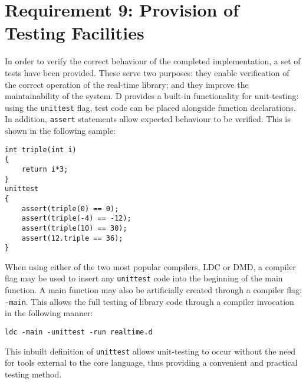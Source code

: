 \section{Requirement 9: Provision of Testing Facilities}
In order to verify the correct behaviour of the completed implementation, a set 
of tests have been provided. These serve two purposes: they enable verification
of the correct operation of the real-time library; and they improve the
maintainability of the system. 
D provides a built-in 
functionality for unit-testing: using the \texttt{unittest} flag, test code can 
be placed alongside function declarations. In addition, \texttt{assert} statements 
allow expected behaviour to be verified. 
This is shown in the following sample:
\begin{lstlisting}[basicstyle=\small]
int triple(int i) 
{
    return i*3; 
}
unittest 
{
    assert(triple(0) == 0); 
    assert(triple(-4) == -12); 
    assert(triple(10) == 30); 
    assert(12.triple == 36);
}
\end{lstlisting}
When using either of the two most popular compilers, LDC or DMD, a compiler
flag may be used to insert any \texttt{unittest} code into the beginning of the 
main function.
A main function may also be artificially created through a compiler flag:
\texttt{-main}. This allows the full testing of library code through a compiler 
invocation in the following manner: 
\begin{lstlisting}[basicstyle=\small]
ldc -main -unittest -run realtime.d
\end{lstlisting}
This inbuilt definition of \texttt{unittest} allows unit-testing to occur 
without the need for tools external to the core language, thus providing a convenient 
and practical testing method. 
